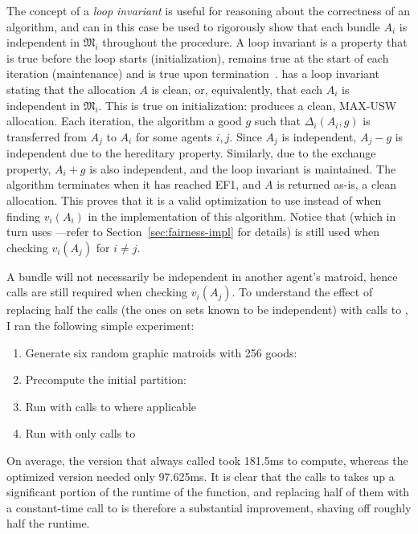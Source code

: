 The concept of a \textit{loop invariant} is useful for reasoning about the correctness of an algorithm, and can in this case be used to rigorously show that each bundle $A_i$ is independent in $\mathfrak{M}_i$ throughout the procedure. A loop invariant is a property that is true before the loop starts (initialization), remains true at the start of each iteration (maintenance) and is true upon termination~\cite{Cormen2009-zm}.  has a loop invariant stating that the allocation $A$ is clean, or, equivalently, that each $A_i$ is independent in $\mathfrak{M}_i$. This is true on initialization:  produces a clean, MAX-USW allocation. Each iteration, the algorithm a good $g$ such that $\Delta_i(A_i, g)$ is transferred from $A_j$ to $A_i$ for some agents $i,j$. Since $A_j$ is independent, $A_j-g$ is independent due to the hereditary property. Similarly, due to the exchange property, $A_i+g$ is also independent, and the loop invariant is maintained. The algorithm terminates when it has reached EF1, and $A$ is returned as-is, a clean allocation. This proves that it is a valid optimization to use  instead of  when finding $v_i(A_i)$ in the implementation of this algorithm. Notice that  (which in turn uses ---refer to Section~\ref{sec:fairness-impl} for details) is still used when checking $v_i(A_j)$ for $i\neq j$. 



A bundle will not necessarily be independent in another agent's matroid, hence  calls are still required when checking $v_i(A_j)$. To understand the effect of replacing half the  calls (the ones on sets known to be independent) with calls to , I ran the following simple experiment:
\begin{enumerate}
  \item Generate six random graphic matroids with 256 goods: \\
  \item Precompute the initial partition: \\
  \item Run  with calls to  where applicable
  \item Run  with only calls to 
\end{enumerate}
On average, the version that always called  took 181.5ms to compute, whereas the optimized version needed only 97.625ms. It is clear that the calls to  takes up a significant portion of the runtime of the function, and replacing half of them with a constant-time call to  is therefore a substantial improvement, shaving off roughly half the runtime.


